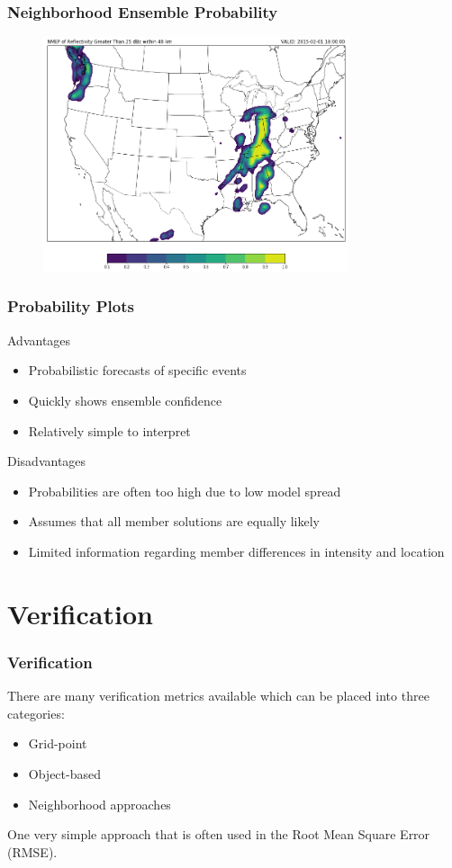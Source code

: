\documentclass{beamer}
\begin{document}
\begin{frame}
  \frametitle{Neighborhood Ensemble Probability}
  \begin{figure}
    \includegraphics[width=0.8\textwidth]{neighbor_probs}
  \end{figure}
\end{frame}

\begin{frame}
  \frametitle{Probability Plots}
  Advantages
  \begin{itemize}
    \item Probabilistic forecasts of specific events
    \item Quickly shows ensemble confidence
    \item Relatively simple to interpret
  \end{itemize}
  Disadvantages
  \begin{itemize}
    \item Probabilities are often too high due to low model spread
    \item Assumes that all member solutions are equally likely
    \item Limited information regarding member differences in intensity and location
  \end{itemize}
\end{frame}



\section{Verification}
\begin{frame}
  \frametitle{Verification}
  There are many verification metrics available which can be placed into three categories:
  \begin{itemize}
    \item Grid-point \citep{Wolff2014}
    \item Object-based \citep{Davis2006}
    \item Neighborhood approaches \citep{Schwartz2017}
  \end{itemize}
  One very simple approach that is often used in the Root Mean Square Error (RMSE).
\end{frame}
\end{document}
